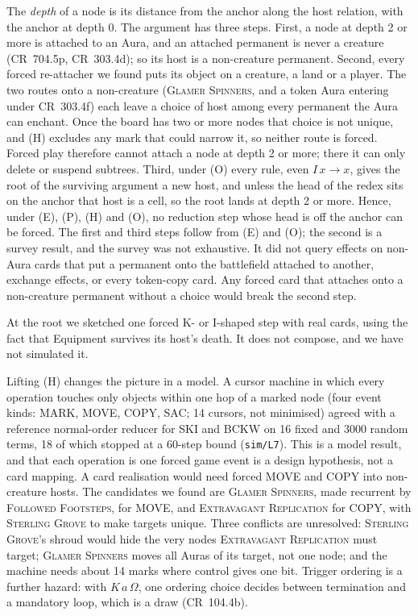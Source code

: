 \documentclass[11pt]{article}
\theoremstyle{definition}
\newcommand{\card}[1]{{\mdseries\scshape #1}}
\newcommand{\CR}[1]{CR~#1}
\begin{document}
The \emph{depth} of a node is its distance from the anchor along the host relation, with
the anchor at depth 0. The argument has three steps. First, a node at depth 2 or more is
attached to an Aura, and an attached permanent is never a creature (\CR{704.5p},
\CR{303.4d}); so its host is a non-creature permanent. Second, every forced re-attacher we
found puts its object on a creature, a land or a player. The two routes onto a
non-creature (\card{Glamer Spinners}, and a token Aura entering under \CR{303.4f}) each
leave a choice of host among every permanent the Aura can enchant. Once the board has two
or more nodes that choice is not unique, and (H) excludes any mark that could narrow it,
so neither route is forced. Forced play therefore cannot attach a node at depth 2 or
more; there it can only delete or suspend subtrees. Third, under (O) every rule, even
$I\,x \to x$, gives the root of the surviving argument a new host, and unless the head of
the redex sits on the anchor that host is a cell, so the root lands at depth 2 or more.
Hence, under (E), (P), (H) and (O), no reduction step whose head is off the anchor can be
forced. The first and third steps follow from (E) and (O); the second is a survey result,
and the survey was not exhaustive. It did not query effects on non-Aura cards that put a
permanent onto the battlefield attached to another, exchange effects, or every token-copy
card. Any forced card that attaches onto a non-creature permanent without a choice would
break the second step.

At the root we sketched one forced K- or I-shaped step with real cards, using the fact
that Equipment survives its host's death. It does not compose, and we have not simulated
it.

Lifting (H) changes the picture in a model. A cursor machine in which every operation
touches only objects within one hop of a marked node (four event kinds: MARK, MOVE, COPY,
SAC; 14 cursors, not minimised) agreed with a reference normal-order reducer for SKI and
BCKW on 16 fixed and 3000 random terms, 18 of which stopped at a 60-step bound
(\texttt{sim/L7}). This is a model result, and that each operation is one forced game
event is a design hypothesis, not a card mapping. A card realisation would need forced MOVE and COPY into
non-creature hosts. The candidates we found are \card{Glamer Spinners}, made recurrent by
\card{Followed Footsteps}, for MOVE, and \card{Extravagant Replication} for COPY, with
\card{Sterling Grove} to make targets unique. Three conflicts are unresolved: \card{Sterling
Grove}'s shroud would hide the very nodes \card{Extravagant Replication} must target;
\card{Glamer Spinners} moves all Auras of its target, not one node; and the machine needs
about 14 marks where control gives one bit. Trigger ordering is a further hazard: with
$K\,a\,\Omega$, one ordering choice decides between termination and a mandatory loop,
which is a draw (\CR{104.4b}).
\end{document}
